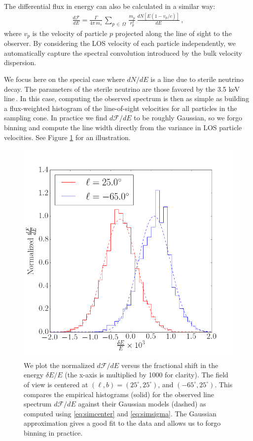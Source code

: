 \documentclass[aps,prd,10pt,twocolumn,superscriptaddress,showpacs]{revtex4-1}
\begin{document}
The differential flux in energy can also be calculated in a similar way:
\begin{eqnarray}
\label{eq:discrete}
\frac{d\mathcal{F}}{dE} = \frac{\Gamma}{4 \pi \, m_s}\, \sum_{p \, \in \, \Omega} \, \frac{m_p}{r_p^{2}} \, \frac{dN[E(1-v_p/c)]}{dE} \, ,
\end{eqnarray}
where $v_p$ is the velocity of particle $p$ projected along the line of sight to the observer.  By
considering the LOS velocity of each particle independently, we automatically capture the spectral
convolution introduced by the bulk velocity dispersion. 

We focus here on the special case where $dN/dE$ is a line due to sterile neutrino decay.  The
parameters of the sterile neutrino are those favored by the 3.5 keV line\,\cite{Bulbul:2014sua}.  In
this case, computing the observed spectrum is then as simple as building a flux-weighted histogram
of the line-of-sight velocities for all particles in the sampling cone. In practice we find
$d\mathcal{F}/dE$ to be roughly Gaussian, so we forgo binning and compute the line width directly
from the variance in LOS particle velocities. See Figure \ref{fig:dfde} for an illustration. 

\begin{figure}[h!]
\centering
\includegraphics[width=1.0\columnwidth]{dnde_demo.png}
\caption{We plot the normalized $d\mathcal{F}/dE$ versus the fractional shift in the energy $\delta
E/E$ (the x-axis is multiplied by 1000 for clarity). The field of view is centered at $(\ell, b) =
(25^\circ, 25^\circ)$, and $(-65^\circ, 25^\circ)$.
	This compares the empirical histograms (solid) for the observed line spectrum
	$d\mathcal{F}/dE$ against their Gaussian models (dashed) as computed using \eqref{eq:simcenter} and \eqref{eq:simsigma}.
	The Gaussian approximation gives a good fit to the data and allows us to forgo binning in practice.}
\label{fig:dfde}
\end{figure}
\end{document}
